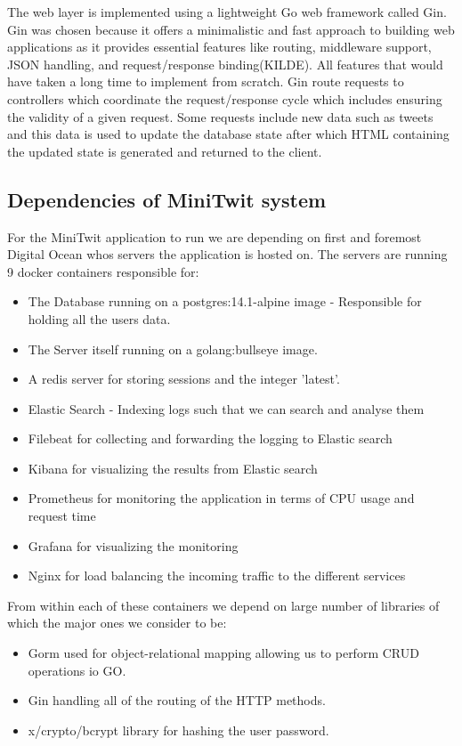 The web layer is implemented using a lightweight Go web framework called Gin. 
Gin was chosen because it offers a minimalistic and fast approach to building web applications as it provides 
essential features like routing, middleware support, JSON handling, and request/response binding(KILDE). 
All features that would have taken a long time to implement from scratch. Gin route requests to controllers 
which coordinate the request/response cycle which includes ensuring the validity of a given request. 
Some requests include new data such as tweets and this data is used to update the database state after 
which HTML containing the updated state is generated and returned to the client. 


\subsection{Dependencies of MiniTwit system}

For the MiniTwit application to run we are depending on first and foremost Digital Ocean whos servers the application is 
hosted on. The servers are running 9 docker containers responsible for: 
\begin{itemize}
    \item The Database running on a postgres:14.1-alpine image - Responsible for holding all the users data.
    \item The Server itself running on a golang:bullseye image.
    \item A redis server for storing sessions and the integer 'latest'.
    \item Elastic Search - Indexing logs such that we can search and analyse them
    \item Filebeat for collecting and forwarding the logging to Elastic search
    \item Kibana for visualizing the results from Elastic search
    \item Prometheus for monitoring the application in terms of CPU usage and request time
    \item Grafana for visualizing the monitoring
    \item Nginx for load balancing the incoming traffic to the different services
\end{itemize}

From within each of these containers we depend on large number of libraries of which the major ones we consider to be:
\begin{itemize}
    \item Gorm used for object-relational mapping allowing us to perform CRUD operations io GO.
    \item Gin handling all of the routing of the HTTP methods.
    \item x/crypto/bcrypt library for hashing the user password.
\end{itemize}


